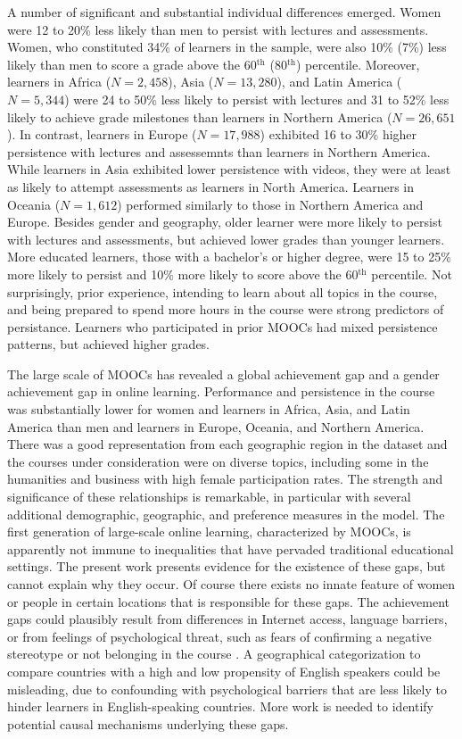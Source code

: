 \documentclass{sigchi}\usepackage[]{graphicx}\usepackage[]{color}
\begin{document}
A number of significant and substantial individual differences emerged. Women were 12 to 20\% less likely than men to persist with lectures and assessments. Women, who constituted 34\% of learners in the sample, were also 10\% (7\%) less likely than men to score a grade above the 60$^\text{th}$ (80$^\text{th}$) percentile.  Moreover, learners in Africa ($N = 2,458$), Asia ($N = 13,280$), and Latin America ($N = 5,344$) were 24 to 50\% less likely to persist with lectures and 31 to 52\% less likely to achieve grade milestones than learners in Northern America ($N = 26,651$). In contrast, learners in Europe ($N = 17,988$) exhibited 16 to 30\% higher persistence with lectures and assessemnts than learners in Northern America. While learners in Asia exhibited lower persistence with videos, they were at least as likely to attempt assessments as learners in North America. Learners in Oceania ($N = 1,612$) performed similarly to those in Northern America and Europe. Besides gender and geography, older learner were more likely to persist with lectures and assessments, but achieved lower grades than younger learners. More educated learners, those with a bachelor's or higher degree, were 15 to 25\% more likely to persist and 10\% more likely to score above the 60$^\text{th}$ percentile. Not surprisingly, prior experience, intending to learn about all topics in the course, and being prepared to spend more hours in the course were strong predictors of persistance. Learners who participated in prior MOOCs had mixed persistence patterns, but achieved higher grades.

The large scale of MOOCs has revealed a global achievement gap and a gender achievement gap in online learning. Performance and persistence in the course was substantially lower for women and learners in Africa, Asia, and Latin America than men and learners in Europe, Oceania, and Northern America. There was a good representation from each geographic region in the dataset and the courses under consideration were on diverse topics, including some in the humanities and business with high female participation rates. The strength and significance of these relationships is remarkable, in particular with several additional demographic, geographic, and preference measures in the model. The first generation of large-scale online learning, characterized by MOOCs, is apparently not immune to inequalities that have pervaded traditional educational settings. The present work presents evidence for the existence of these gaps, but cannot explain why they occur. Of course there exists no innate feature of women or people in certain locations that is responsible for these gaps. The achievement gaps could plausibly result from differences in Internet access, language barriers, or from feelings of psychological threat, such as fears of confirming a negative stereotype \cite{spencer1999stereotype} or not belonging in the course \cite{walton2007question}. A geographical categorization to compare countries with a high and low propensity of English speakers could be misleading, due to confounding with psychological barriers that are less likely to hinder learners in English-speaking countries. More work is needed to identify potential causal mechanisms underlying these gaps.
\end{document}

